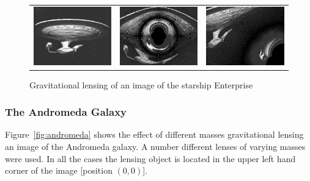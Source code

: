 \documentclass[aspectratio=1610,xcolor=dvipsnames,t]{beamer}
\begin{document}
\begin{figure}
    \caption{Gravitational lensing of an image of the starship Enterprise} 
    \label{fig:enterprise} 
    \begin{center}
        \begin{tabular}{ccc}
            \includegraphics[width=0.6\columnwidth]{pics/1701.eps} &
            \includegraphics[width=0.6\columnwidth]{pics/ent_2e30.eps} &
            \includegraphics[width=0.6\columnwidth]{pics/ent_1e31.eps} 
        \end{tabular}
    \end{center}
\end{figure}

\subsubsection{The Andromeda Galaxy}     
Figure~\ref{fig:andromeda} shows the effect of different masses gravitational lensing
an image of the Andromeda galaxy.  A number different lenses
of varying masses were used. In all the cases the lensing object
is located in the upper left hand corner of the image [position $(0,0)$].
\end{document}
